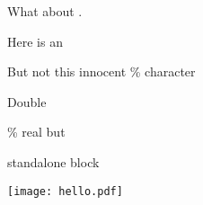  

What about .

Here is an %

But not this innocent \% character


Double %

\% real but %

{standalone block}


\texttt{[image: hello.pdf]}







